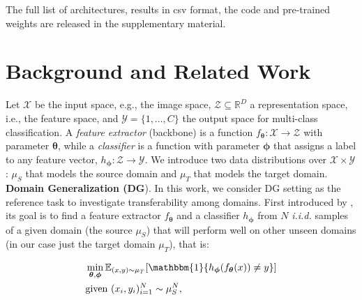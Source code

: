 \documentclass{article}
\begin{document}
The full list of architectures, results in csv format, the code and pre-trained weights are released in the supplementary material.


\section{Background and Related Work}
\label{related_sec}

Let $\mathcal{X}$ be the input space, e.g., the image  space, $\mathcal{Z} \subseteq \mathbb{R}^D$ a representation space, i.e., the feature space, and $\mathcal{Y} = \{1, \ldots, C\}$ the output space for multi-class classification.
A \textit{feature extractor} (backbone) is a function $f_{\bm{\theta}}: \mathcal{X} \to \mathcal{Z}$ with parameter $\bm{\theta}$, while a \textit{classifier} is a function with parameter $\bm{\phi}$ that assigns a label to any feature vector, $h_{\bm{\phi}}: \mathcal{Z} \to \mathcal{Y}$.
We introduce two data distributions over $\mathcal{X} \times \mathcal{Y}$: $\mu_S$ that models the source domain and $\mu_T$ that models the target domain.\\
\textbf{Domain Generalization (DG}). In this work, we consider DG setting as the reference task to investigate transferability among domains. First introduced by \cite{blanchard2011generalizing}, its goal is to find a feature extractor $f_{\bm{\theta}}$ and a classifier $h_{\bm{\phi}}$ from $N$ \textit{i.i.d.} samples of a given domain (the source $\mu_S$) that will perform well on other unseen domains (in our case just the target domain $\mu_T$), that is:

\vspace{-0.4cm}
\begin{align}
&\min_{\bm{\theta}, \bm{\phi}} \mathbb{E}_{(x, y) \sim \mu_T}[\mathbbm{1}\{h_{\bm{\phi}}(f_{\bm{\theta}}(x)) \neq y\}]  \\
&\text{given } (x_i, y_i)_{i=1}^N \sim \mu_S^N,
\end{align}
\vspace{-0.3cm}
\end{document}
